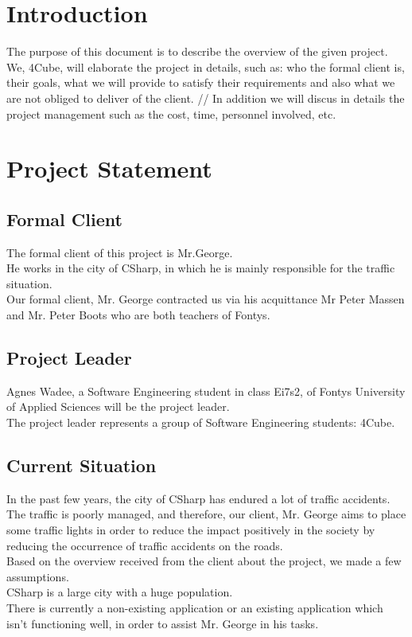 \documentclass[a4paper,11pt]{article}
\title{\Title}
\author{}
\date{\today}
\begin{document}
\begin{titlepage}
\maketitle
\end{titlepage}

  	\linespread{1.15} %
    
  	
  	\tableofcontents
  	\newpage
  	\section{Introduction}
  	The purpose of this document is to describe the overview of the given project. We, 4Cube, will elaborate the project in details, such as: who the formal client is, their goals, what we will provide to satisfy their requirements and also what we are not obliged to deliver of the client. // In addition we will discus in details the project management such as the cost, time, personnel involved, etc.  
  	
  	\section{Project Statement }
  	\subsection{Formal Client}
  	The formal client of this project is Mr.George. \\ He works in the city of CSharp, in which he is mainly responsible for the traffic situation. \\
  	Our formal client, Mr. George contracted us via his acquittance Mr Peter Massen and Mr. Peter Boots who are both teachers of Fontys. 
  	
    \subsection{Project Leader}
    Agnes Wadee, a Software Engineering student in class Ei7s2, of Fontys University of Applied Sciences will be the project leader. \\ The project leader represents a group of Software Engineering students: 4Cube.
    
    \subsection{Current Situation}  
    In the past few years, the city of CSharp has endured a lot of traffic accidents. The traffic is poorly managed, and therefore, our client, Mr. George aims to place some traffic lights in order to reduce the impact positively in the society by reducing the occurrence  of traffic accidents on the roads.  \\ Based on the overview received from the client about the project, we made a few assumptions. \\ CSharp is a large city with a huge population.\\ There is currently a non-existing application or an existing application which isn't functioning well, in order to assist Mr. George in his tasks.	
    
\end{document}
